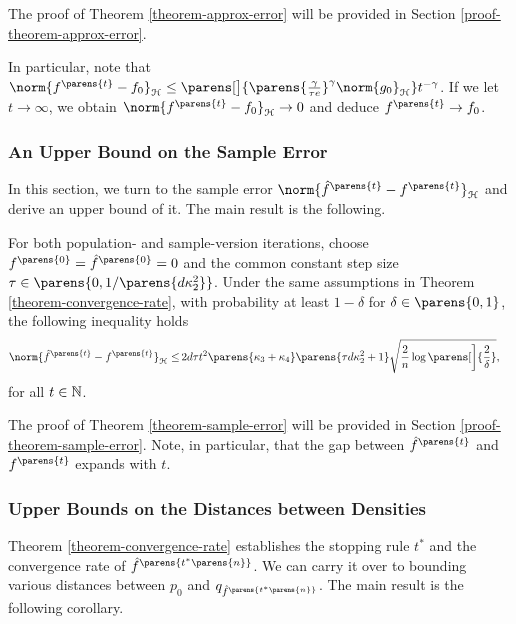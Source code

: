 The proof of Theorem \ref{theorem-approx-error} will be provided in Section \ref{proof-theorem-approx-error}. 

In particular, note that $\norm{f^{\parens{t}} - f_0}_{\calH} \le \parens[\big]{\parens{\frac{\gamma}{\tau e }}^{\gamma} \norm{g_0}_{\hil}} t^{-\gamma}$. If we let $t \to \infty$, we obtain $\norm{f^{\parens{t}} - f_0}_{\calH} \to 0$ and deduce $f^{\parens{t}} \to f_0$. %

\subsubsection{An Upper Bound on the Sample Error}

In this section, we turn to the sample error $\norm{\hat{f}^{\parens{t}} - f^{\parens{t}}}_{\calH}$ and derive an upper bound of it. The main result is the following. 

\begin{theorem}\label{theorem-sample-error}
	For both population- and sample-version iterations, choose $f^{\parens{0}} = \hat{f}^{\parens{0}} = 0$ and the common constant step size $\tau \in \parens{0, 1/\parens{d \kappa_2^2}}$. Under the same assumptions in Theorem \ref{theorem-convergence-rate}, with probability at least $1 - \delta$ for $\delta \in \parens{0, 1}$, the following inequality holds 
	\begin{align*}%
		\norm{\hat{f}^{\parens{t}} - f^{\parens{t}}}_{\calH} \le & \, 2 d \tau t^2 \parens{\kappa_3 + \kappa_4} \parens{\tau d \kappa_2^2 + 1} \sqrt{\frac{2}{n} \log \parens[\bigg]{\frac{2}{\delta}}},  
	\end{align*}
	for all $t \in \mathbb{N}$. 
\end{theorem}

The proof of Theorem \ref{theorem-sample-error} will be provided in Section \ref{proof-theorem-sample-error}. Note, in particular, that the gap between $\hat{f}^{\parens{t}}$ and $f^{\parens{t}}$ expands with $t$. 

\subsubsection{Upper Bounds on the Distances between Densities}

Theorem \ref{theorem-convergence-rate} establishes the stopping rule $t^*$ and the convergence rate of $\hat{f}^{\parens{t^* \parens{n}}}$. We can carry it over to bounding various distances between $p_0$ and $q_{\hat{f}^{\parens{t^* \parens{n}}}}$. The main result is the following corollary. 

